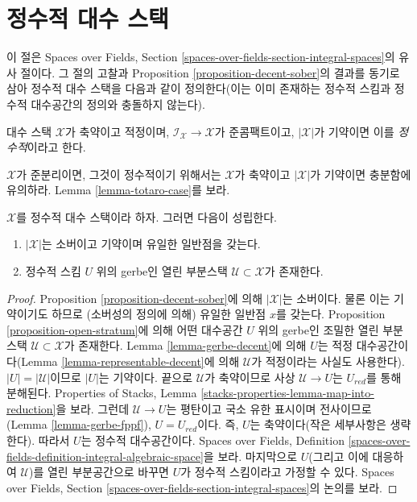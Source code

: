 \section{정수적 대수 스택}
\label{section-integral-stacks}

\noindent
이 절은 Spaces over Fields, Section
\ref{spaces-over-fields-section-integral-spaces}의 유사 절이다.
그 절의 고찰과 Proposition \ref{proposition-decent-sober}의 결과를 동기로
삼아 정수적 대수 스택을 다음과 같이 정의한다(이는 이미 존재하는 정수적
스킴과 정수적 대수공간의 정의와 충돌하지 않는다).

\begin{definition}
\label{definition-integral-algebraic-stack}
대수 스택 $\mathcal{X}$가 축약이고 적정이며,
$\mathcal{I}_\mathcal{X} \to \mathcal{X}$가 준콤팩트이고,
$|\mathcal{X}|$가 기약이면 이를 {\it 정수적}이라고 한다.
\end{definition}

\noindent
$\mathcal{X}$가 준분리이면, 그것이 정수적이기 위해서는
$\mathcal{X}$가 축약이고 $|\mathcal{X}|$가 기약이면 충분함에 유의하라.
Lemma \ref{lemma-totaro-case}를 보라.

\begin{lemma}
\label{lemma-structure-integral-stack}
$\mathcal{X}$를 정수적 대수 스택이라 하자. 그러면 다음이 성립한다.
\begin{enumerate}
\item $|\mathcal{X}|$는 소버이고 기약이며 유일한 일반점을 갖는다.
\item 정수적 스킴 $U$ 위의 gerbe인 열린 부분스택
$\mathcal{U} \subset \mathcal{X}$가 존재한다.
\end{enumerate}
\end{lemma}

\begin{proof}
Proposition \ref{proposition-decent-sober}에 의해 $|\mathcal{X}|$는
소버이다. 물론 이는 기약이기도 하므로 (소버성의 정의에 의해) 유일한
일반점 $x$를 갖는다. Proposition \ref{proposition-open-stratum}에 의해
어떤 대수공간 $U$ 위의 gerbe인 조밀한 열린 부분스택
$\mathcal{U} \subset \mathcal{X}$가 존재한다. Lemma
\ref{lemma-gerbe-decent}에 의해 $U$는 적정 대수공간이다(Lemma
\ref{lemma-representable-decent}에 의해 $\mathcal{U}$가 적정이라는 사실도
사용한다). $|U| = |\mathcal{U}|$이므로 $|U|$는 기약이다. 끝으로
$\mathcal{U}$가 축약이므로 사상 $\mathcal{U} \to U$는 $U_{red}$를 통해
분해된다. Properties of Stacks, Lemma
\ref{stacks-properties-lemma-map-into-reduction}을 보라. 그런데
$\mathcal{U} \to U$는 평탄이고 국소 유한 표시이며 전사이므로(Lemma
\ref{lemma-gerbe-fppf}), $U = U_{red}$이다. 즉, $U$는 축약이다(작은
세부사항은 생략한다). 따라서 $U$는 정수적 대수공간이다. Spaces over
Fields, Definition \ref{spaces-over-fields-definition-integral-algebraic-space}을
보라. 마지막으로 $U$(그리고 이에 대응하여 $\mathcal{U}$)를 열린
부분공간으로 바꾸면 $U$가 정수적 스킴이라고 가정할 수 있다. Spaces over
Fields, Section \ref{spaces-over-fields-section-integral-spaces}의 논의를 보라.
\end{proof}

